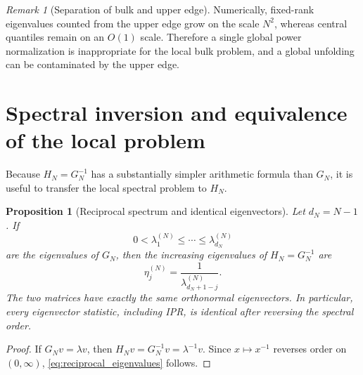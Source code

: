 \documentclass[11pt]{amsart}
\numberwithin{equation}{section}
\theoremstyle{plain}
\newtheorem{proposition}[theorem]{Proposition}
\theoremstyle{definition}
\theoremstyle{remark}
\newtheorem{remark}[theorem]{Remark}
\begin{document}
\begin{remark}[Separation of bulk and upper edge]
\label{rem:edge_bulk_separation}
Numerically, fixed-rank eigenvalues counted from the upper edge grow on the scale $N^2$, whereas central quantiles remain on an $O(1)$ scale.  Therefore a single global power normalization is inappropriate for the local bulk problem, and a global unfolding can be contaminated by the upper edge.
\end{remark}

\section{Spectral inversion and equivalence of the local problem}
\label{sec:spectral_inversion}

Because $H_N=G_N^{-1}$ has a substantially simpler arithmetic formula than $G_N$, it is useful to transfer the local spectral problem to $H_N$.

\begin{proposition}[Reciprocal spectrum and identical eigenvectors]
\label{prop:reciprocal_spectrum}
Let $d_N=N-1$.  If
\begin{equation}
0<\lambda_1^{(N)}\le\cdots\le\lambda_{d_N}^{(N)}
\end{equation}
are the eigenvalues of $G_N$, then the increasing eigenvalues of $H_N=G_N^{-1}$ are
\begin{equation}
\eta_j^{(N)}=\frac{1}{\lambda_{d_N+1-j}^{(N)}}.
\label{eq:reciprocal_eigenvalues}
\end{equation}
The two matrices have exactly the same orthonormal eigenvectors.  In particular, every eigenvector statistic, including IPR, is identical after reversing the spectral order.
\end{proposition}

\begin{proof}
If $G_Nv=\lambda v$, then $H_Nv=G_N^{-1}v=\lambda^{-1}v$.  Since $x\mapsto x^{-1}$ reverses order on $(0,\infty)$, \eqref{eq:reciprocal_eigenvalues} follows.
\end{proof}
\end{document}
